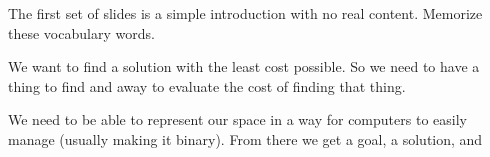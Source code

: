 \documentclass[12pt]{article}
\begin{document}
The first set of slides is a simple introduction with no real content. Memorize these vocabulary words.


We want to find a solution with the least cost possible. So we need to have a thing to find and away to evaluate the cost of finding that thing.

We need to be able to represent our space in a way for computers to easily manage (usually making it binary). From there we get a goal, a solution, and
\end{document}
